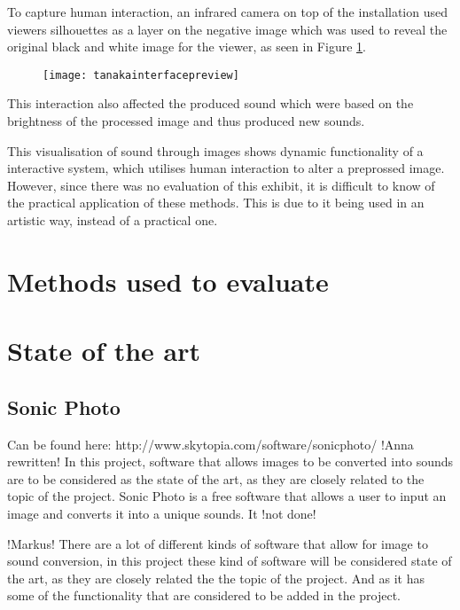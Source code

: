 To capture human interaction, an infrared camera on top of the installation used viewers silhouettes as a layer on the negative image which was used to reveal the original black and white image for the viewer, as seen in Figure \ref{fig:tanakainterfacepreview}.

\begin{figure}[!h]
\centering
\texttt{[image: tanakainterfacepreview]}
\caption{\label{fig:tanakainterfacepreview}\cite{Tanaka2012}}
\end{figure}

This interaction also affected the produced sound which were based on the brightness of the processed image and thus produced new sounds. 

This visualisation of sound through images shows dynamic functionality of a interactive system, which utilises human interaction to alter a preprossed image. However, since there was no evaluation of this exhibit, it is difficult to know of the practical application of these methods. This is due to it being used in an artistic way, instead of a practical one.   

\section{Methods used to evaluate}\label{sub:methodsusedtoevaluate}


\section{State of the art}\label{sec:stateart}

\subsection{Sonic Photo}\label{sub:sonic}
Can be found here: http://www.skytopia.com/software/sonicphoto/
!Anna rewritten!
In this project, software that allows images to be converted into sounds are to be considered as the state of the art, as they are closely related to the topic of the project. 
Sonic Photo is a free software that allows a user to input an image and converts it into a unique sounds. It !not done!




!Markus!
There are a lot of different kinds of software that allow for image to sound conversion, in this project these kind of software will be considered state of the art, as they are closely related the the topic of the project. And as it has some of the functionality that are considered to be added in the project.


